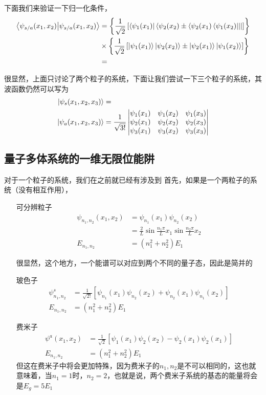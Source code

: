 \documentclass{article}
\newcommand{\vmthree}[9]{
    \begin{vmatrix}
        #1&#2&#3\\
        #4&#5&#6\\
        #7&#8&#9
    \end{vmatrix}
}
\begin{document}
下面我们来验证一下归一化条件，
\begin{align*}
    \braket{\psi_{s/a}(x_1,x_2)}{\psi_{s/a}(x_1,x_2)}&=\left\{\frac{1}{\sqrt{2}}\left[\bra{\psi_1(x_1)}\bra{\psi_2(x_2)\pm\bra{\psi_2(x_1)\bra{\psi_1(x_2)}}}\right]\right\}\\
    &\times\left\{\frac{1}{\sqrt{2}}\left[\ket{\psi_1(x_1)}\ket{\psi_2(x_2)}\pm\ket{\psi_2(x_1)}\ket{\psi_1(x_2)}\right]\right\}\\
    &=
\end{align*}

很显然，上面只讨论了两个粒子的系统，下面让我们尝试一下三个粒子的系统，其波函数仍然可以写为
\begin{align*}
    \ket{\psi_s(x_1,x_2,x_3)}&=\\
    \ket{\psi_a(x_1,x_2,x_3)}&=\frac{1}{\sqrt{3!}}\vmthree{\psi_1(x_1)}{\psi_1(x_2)}{\psi_1(x_3)}{\psi_2(x_1)}{\psi_2(x_2)}{\psi_2(x_3)}{\psi_3(x_1)}{\psi_3(x_2)}{\psi_3(x_3)}
\end{align*}

\subsection{量子多体系统的一维无限位能阱}
对于一个粒子的系统，我们在之前就已经有涉及到
首先，如果是一个两粒子的系统（没有相互作用），
\begin{enumerate}
    \item[可分辨粒子] 
    \begin{align*}
        \psi_{n_1,n_2}(x_1,x_2)&=\psi_{n_1}(x_1)\psi_{n_2}(x_2)\\
        &=\frac{2}{L}\sin{\frac{n_1\pi}{L}x_1}\sin{\frac{n_2\pi}{L}x_2}\\
        E_{n_1,n_2}&=(n_1^2+n_2^2)E_1
    \end{align*}

    很显然，这个地方，一个能谱可以对应到两个不同的量子态，因此是简并的
    \item[玻色子]
    \begin{align*}
        \psi_{n_1,n_2}^s&=\frac{1}{\sqrt{2!}}\left[\psi_{n_1}(x_1)\psi_{n_2}(x_2)+\psi_{n_2}(x_1)\psi_{n_1}(x_2)\right]\\
        E_{n_1,n_2}&=(n_1^2+n_2^2)E_1
    \end{align*}
    \item[费米子] 
    \begin{align*}
        \psi^a(x_1,x_2)&=\frac{1}{\sqrt{2}}\left[\psi_1(x_1)\psi_2(x_2)-\psi_2(x_1)\psi_2(x_1)\right]\\
        E_{n_1,n_2}&=(n_1^2+n_2^2)E_1
    \end{align*}
    但这在费米子中将会更加特殊，因为费米子的$n_1,n_2$是不可以相同的，这也就意味着，当$n_1=1$时，$n_2=2$，也就是说，两个费米子系统的基态的能量将会是$E_g=5E_1$
\end{enumerate}
\end{document}
